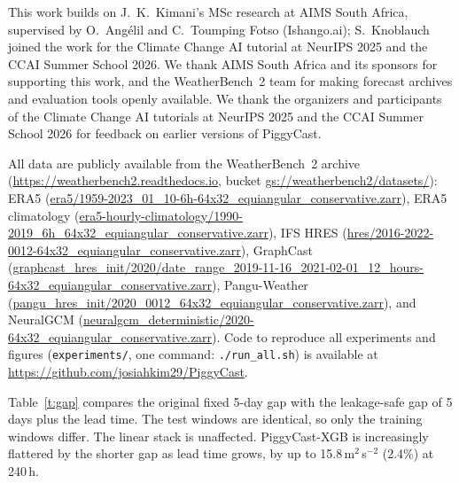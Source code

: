 \documentclass[twocol]{ametsocV6.1}
\newcommand{\units}{m$^{2}$\,s$^{-2}$}
\newcommand{\PCXGB}{PiggyCast-XGB}
\begin{document}
\acknowledgments
This work builds on J.~K.~Kimani's MSc research at AIMS South Africa, supervised by O.~Ang\'elil and C.~Toumping Fotso (Ishango.ai); S.~Knoblauch joined the work for the Climate Change AI tutorial at NeurIPS 2025 and the CCAI Summer School 2026. We thank AIMS South Africa and its sponsors for supporting this work, and the WeatherBench~2 team for making forecast archives and evaluation tools openly available. We thank the organizers and participants of the Climate Change AI tutorials at NeurIPS 2025 and the CCAI Summer School 2026 for feedback on earlier versions of PiggyCast.

\datastatement
All data are publicly available from the WeatherBench~2 archive (\url{https://weatherbench2.readthedocs.io}, bucket \url{gs://weatherbench2/datasets/}): ERA5 (\url{era5/1959-2023_01_10-6h-64x32_equiangular_conservative.zarr}), ERA5 climatology (\url{era5-hourly-climatology/1990-2019_6h_64x32_equiangular_conservative.zarr}), IFS HRES (\url{hres/2016-2022-0012-64x32_equiangular_conservative.zarr}), GraphCast (\url{graphcast_hres_init/2020/date_range_2019-11-16_2021-02-01_12_hours-64x32_equiangular_conservative.zarr}), Pangu-Weather (\url{pangu_hres_init/2020_0012_64x32_equiangular_conservative.zarr}), and NeuralGCM (\url{neuralgcm_deterministic/2020-64x32_equiangular_conservative.zarr}). Code to reproduce all experiments and figures (\texttt{experiments/}, one command: \texttt{./run\_all.sh}) is available at \url{https://github.com/josiahkim29/PiggyCast}.

\appendix[A]

Table~\ref{t:gap} compares the original fixed 5-day gap with the leakage-safe gap of 5 days plus the lead time. The test windows are identical, so only the training windows differ. The linear stack is unaffected. \PCXGB{} is increasingly flattered by the shorter gap as lead time grows, by up to 15.8\,\units{} (2.4\%) at 240\,h.
\end{document}
